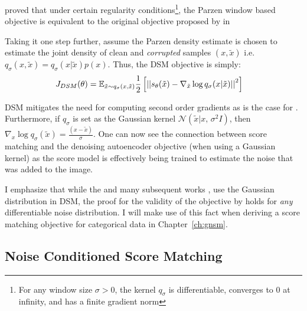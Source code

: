 \cite{vincent2011connection} proved that under certain regularity conditions\footnote{For any window size $\sigma > 0$, the kernel $q_{\sigma}$ is differentiable, converges to 0 at infinity, and has a finite gradient norm},
the Parzen window based objective is equivalent to the original objective proposed by \cite{hyvarinen2005} in 

Taking it one step further, assume the Parzen density estimate is chosen to estimate the joint density of clean and \textit{corrupted} samples $(x, \tilde{x})$ i.e. $q_{\sigma}(x, \tilde{x}) = q_{\sigma}(x | \tilde{x} ) p(x) $. Thus, the DSM objective is simply:
\begin{align}
\label{eq:denoising_sm}
    J_{DSM}(\theta) &= \mathbb{E}_{\tilde{x}\sim q_{\sigma}(x, \tilde{x})} \frac{1}{2} \left[ { \left|\left| {s_\theta(\tilde{x}) - \nabla_{\tilde{x}} \log q_{\sigma}(x | \tilde{x}) } \right|\right|^2 } \right]
\end{align}

DSM mitigates the need for computing second order gradients as is the case for . Furthermore, if $q_{\sigma}$ is set as the Gaussian kernel $\mathcal{N}(\tilde{x} |  x,\,\sigma^{2}I)$, then $\nabla_x \log q_{\sigma}(\tilde{x}) = \frac{(x - \tilde{x})}{\sigma}$. One can now see the connection between score matching and the denoising autoencoder objective (when using a Gaussian kernel) as the score model is effectively being trained to estimate the noise that was added to the image.

I emphasize that while the \cite{vincent2011connection} and many subsequent works \cite{Song2019,song2020improved,song2020score}, use the Gaussian distribution in DSM, the proof for the validity of the objective by \cite{vincent2011connection} holds for \textit{any} differentiable noise distribution.
I will make use of this fact when deriving a score matching objective for categorical data in Chapter~\ref{ch:gnsm}.

\subsection*{Noise Conditioned Score Matching}
\label{NCSM}

